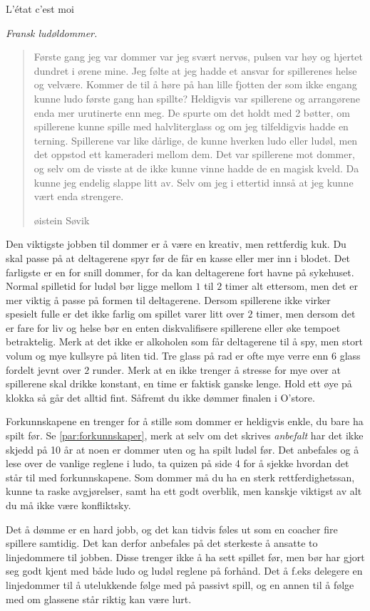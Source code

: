 \documentclass[10pt,a4paper,norsk,openany]{book}
\begin{document}
\epigraph{L'état c'est moi}{\textit{Fransk ludøldommer.}}

\blockquote[øistein Søvik]{%
  Første gang jeg var dommer var jeg svært nervøs, pulsen var høy og hjertet
  dundret i ørene mine. Jeg følte at jeg hadde et ansvar for spillerenes helse
  og velvære. Kommer de til å høre på han lille fjotten der som ikke engang
  kunne ludo første gang han spillte? Heldigvis var spillerene og arrangørene
  enda mer urutinerte enn meg. De spurte om det holdt med 2 bøtter, om
  spillerene kunne spille med halvliterglass og om jeg tilfeldigvis hadde en
  terning. Spillerene var like dårlige, de kunne hverken ludo eller ludøl, men
  det oppstod ett kameraderi mellom dem. Det var spillerene mot dommer, og selv
  om de visste at de ikke kunne vinne hadde de en magisk kveld. Da kunne jeg
  endelig slappe litt av. Selv om jeg i ettertid innså at jeg kunne vært enda strengere.
}


Den viktigste jobben til dommer er å være en kreativ, men rettferdig kuk. Du
skal passe på at deltagerene spyr før de får en kasse eller mer inn i blodet.
Det farligste er en for snill dommer, for da kan deltagerene fort havne på
sykehuset. Normal spilletid for ludøl bør ligge mellom $1$ til $2$ timer alt
ettersom, men det er mer viktig å passe på formen til deltagerene. Dersom
spillerene ikke virker spesielt fulle er det ikke farlig om spillet varer litt
over $2$ timer, men dersom det er fare for liv og helse bør en enten
diskvalifisere spillerene eller øke tempoet betraktelig. Merk at det ikke er
alkoholen som får deltagerene til å spy, men stort volum og mye kullsyre på
liten tid. Tre glass på rad er ofte mye verre enn 6 glass fordelt jevnt over $2$
runder. Merk at en ikke trenger å stresse for mye over at spillerene skal drikke
konstant, en time er faktisk ganske lenge. Hold ett øye på klokka så går det
alltid fint. Såfremt du ikke dømmer finalen i O'store. 

Forkunnskapene en trenger for å stille som dommer er heldigvis enkle, du bare ha
spilt før. Se \cref{par:forkunnskaper}, merk at selv om det skrives
\emph{anbefalt} har det ikke skjedd på 10 år at noen er dommer uten og ha spilt
ludøl før. Det anbefales og å lese over de vanlige reglene i ludo, ta quizen på
side 4 for å sjekke hvordan det står til med forkunnskapene. Som dommer må du ha
en sterk rettferdighetssan, kunne ta raske avgjørelser, samt ha ett godt
overblik, men kanskje viktigst av alt du må ikke være konfliktsky.

Det å dømme er en hard jobb, og det kan tidvis føles ut som en coacher fire
spillere samtidig. Det kan derfor anbefales på det sterkeste å ansatte to
linjedommere til jobben. Disse trenger ikke å ha sett spillet før, men bør har
gjort seg godt kjent med både ludo og ludøl reglene på forhånd. Det å f.eks
delegere en linjedommer til å utelukkende følge med på passivt spill, og en
annen til å følge med om glassene står riktig kan være lurt. 
\end{document}
